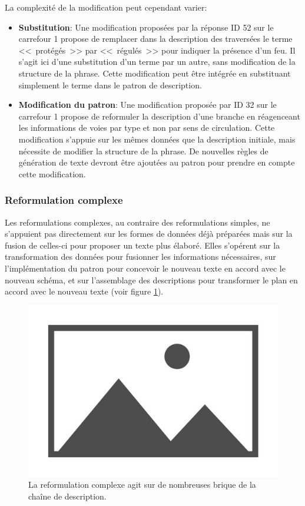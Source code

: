 \newpar{}

La complexité de la modification peut cependant varier:
\begin{itemize}
    \item \textbf{Substitution}: Une modification proposées par la réponse ID 52 sur le carrefour 1 propose de remplacer dans la description des traversées le terme <<~protégés~>> par <<~régulés~>> pour indiquer la présence d'un feu. Il s'agit ici d'une substitution d'un terme par un autre, sans modification de la structure de la phrase. Cette modification peut être intégrée en substituant simplement le terme dans le patron de description.
    \item \textbf{Modification du patron}: Une modification proposée par ID 32 sur le carrefour 1 propose de reformuler la description d'une branche en réagenceant les informations de voies par type et non par sens de circulation. Cette modification s'appuie sur les mêmes données que la description initiale, mais nécessite de modifier la structure de la phrase. De nouvelles règles de génération de texte devront être ajoutées au patron pour prendre en compte cette modification.
\end{itemize}

\subsubsection{Reformulation complexe}

Les reformulations complexes, au contraire des reformulations simples, ne s'appuient pas directement sur les formes de données déjà préparées mais sur la fusion de celles-ci pour proposer un texte plus élaboré. Elles s'opérent sur la transformation des données pour fusionner les informations nécessaires, sur l'implémentation du patron pour concevoir le nouveau texte en accord avec le nouveau schéma, et sur l'assemblage des descriptions pour transformer le plan en accord avec le nouveau texte (voir figure \ref{fig:evaluation_reformulation_complexe}).

\begin{figure}[ht]
    \centering
    \includegraphics{images/placeholder.jpg}
    \caption{La reformulation complexe agit sur de nombreuses brique de la chaîne de description.}
    \label{fig:evaluation_reformulation_complexe}
\end{figure}

